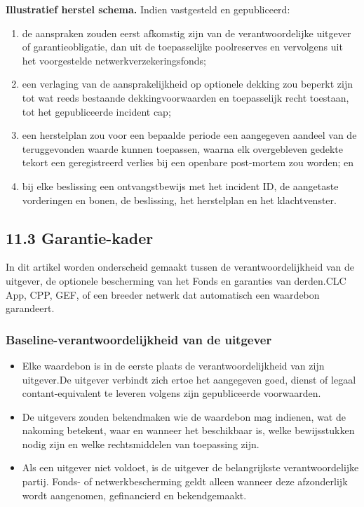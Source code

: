 \documentclass[11pt]{article}
\begin{document}
\textbf{Illustratief herstel schema.} Indien vastgesteld en gepubliceerd:

\begin{enumerate}[leftmargin=*]
\item de aanspraken zouden eerst afkomstig zijn van de verantwoordelijke uitgever of garantieobligatie, dan uit de toepasselijke poolreserves en vervolgens uit het voorgestelde netwerkverzekeringsfonds;
\item een verlaging van de aansprakelijkheid op optionele dekking zou beperkt zijn tot wat reeds bestaande dekkingvoorwaarden en toepasselijk recht toestaan, tot het gepubliceerde incident cap;
\item een herstelplan zou voor een bepaalde periode een aangegeven aandeel van de teruggevonden waarde kunnen toepassen, waarna elk overgebleven gedekte tekort een geregistreerd verlies bij een openbare post-mortem zou worden; en
\item bij elke beslissing een ontvangstbewijs met het incident ID, de aangetaste vorderingen en bonen, de beslissing, het herstelplan en het klachtvenster.
\end{enumerate}
\subsection*{11.3 Garantie-kader}

In dit artikel worden onderscheid gemaakt tussen de verantwoordelijkheid van de uitgever, de optionele bescherming van het Fonds en garanties van derden.CLC App, CPP, GEF, of een breeder netwerk dat automatisch een waardebon garandeert.

\subsubsection*{Baseline-verantwoordelijkheid van de uitgever}

\begin{itemize}[leftmargin=*]
\item Elke waardebon is in de eerste plaats de verantwoordelijkheid van zijn uitgever.De uitgever verbindt zich ertoe het aangegeven goed, dienst of legaal contant-equivalent te leveren volgens zijn gepubliceerde voorwaarden.
\item De uitgevers zouden bekendmaken wie de waardebon mag indienen, wat de nakoming betekent, waar en wanneer het beschikbaar is, welke bewijsstukken nodig zijn en welke rechtsmiddelen van toepassing zijn.
\item Als een uitgever niet voldoet, is de uitgever de belangrijkste verantwoordelijke partij. Fonds- of netwerkbescherming geldt alleen wanneer deze afzonderlijk wordt aangenomen, gefinancierd en bekendgemaakt.
\end{itemize}
\end{document}
